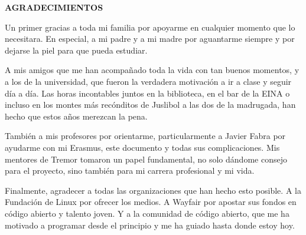 
\begin{center}
{\LARGE \bfseries AGRADECIMIENTOS}
\vspace{2.5cm}
\end{center}

Un primer gracias a toda mi familia por apoyarme en cualquier momento que lo
necesitara. En especial, a mi padre y a mi madre por aguantarme siempre y por
dejarse la piel para que pueda estudiar.

A mis amigos que me han acompañado toda la vida con tan buenos momentos, y a los
de la universidad, que fueron la verdadera motivación a ir a clase y seguir día
a día. Las horas incontables juntos en la biblioteca, en el bar de la EINA o
incluso en los montes más recónditos de Juslibol a las dos de la madrugada, han
hecho que estos años merezcan la pena.

También a mis profesores por orientarme, particularmente a Javier Fabra por
ayudarme con mi Erasmus, este documento y todas sus complicaciones. Mis mentores
de Tremor tomaron un papel fundamental, no solo dándome consejo para el
proyecto, sino también para mi carrera profesional y mi vida.

Finalmente, agradecer a todas las organizaciones que han hecho esto posible. A
la Fundación de Linux por ofrecer los medios. A Wayfair por apostar sus fondos
en código abierto y talento joven. Y a la comunidad de código abierto, que me ha
motivado a programar desde el principio y me ha guiado hasta donde estoy hoy.
